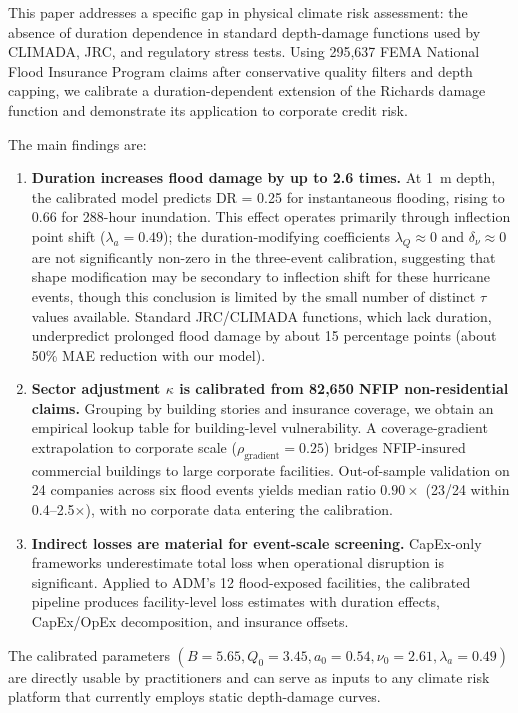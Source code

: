 This paper addresses a specific gap in physical climate risk assessment: the absence of duration dependence in standard depth-damage functions used by CLIMADA, JRC, and regulatory stress tests. Using 295{,}637 FEMA National Flood Insurance Program claims after conservative quality filters and depth capping, we calibrate a duration-dependent extension of the Richards damage function and demonstrate its application to corporate credit risk.

The main findings are:

\begin{enumerate}
    \item \textbf{Duration increases flood damage by up to 2.6 times.} At 1~m depth, the calibrated model predicts DR = 0.25 for instantaneous flooding, rising to 0.66 for 288-hour inundation. This effect operates primarily through inflection point shift ($\lambda_a = 0.49$); the duration-modifying coefficients $\lambda_Q \approx 0$ and $\delta_\nu \approx 0$ are not significantly non-zero in the three-event calibration, suggesting that shape modification may be secondary to inflection shift for these hurricane events, though this conclusion is limited by the small number of distinct $\tau$ values available. Standard JRC/CLIMADA functions, which lack duration, underpredict prolonged flood damage by about 15 percentage points (about 50\% MAE reduction with our model).

    \item \textbf{Sector adjustment $\kappa$ is calibrated from 82{,}650 NFIP non-residential claims.} Grouping by building stories and insurance coverage, we obtain an empirical lookup table for building-level vulnerability. A coverage-gradient extrapolation to corporate scale ($\rho_{\text{gradient}} = 0.25$) bridges NFIP-insured commercial buildings to large corporate facilities. Out-of-sample validation on 24 companies across six flood events yields median ratio $0.90\times$ (23/24 within 0.4--2.5$\times$), with no corporate data entering the calibration.

    \item \textbf{Indirect losses are material for event-scale screening.} CapEx-only frameworks underestimate total loss when operational disruption is significant. Applied to ADM's 12 flood-exposed facilities, the calibrated pipeline produces facility-level loss estimates with duration effects, CapEx/OpEx decomposition, and insurance offsets.
\end{enumerate}

The calibrated parameters $(B = 5.65, Q_0 = 3.45, a_0 = 0.54, \nu_0 = 2.61, \lambda_a = 0.49)$ are directly usable by practitioners and can serve as inputs to any climate risk platform that currently employs static depth-damage curves.

